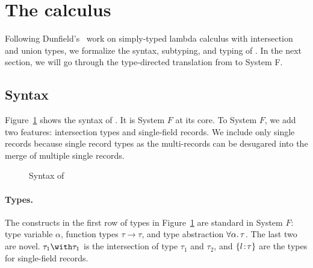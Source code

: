 \section{The \name calculus}



Following Dunfield's~\cite{dunfield2014elaborating} work on simply-typed lambda
calculus with intersection and union types, we formalize the syntax, subtyping,
and typing of \name. In the next section, we will go through the type-directed
translation from \name to System F.



\subsection{Syntax}

Figure~\ref{fig:fi-syntax} shows the syntax of \name. It is System $ F $ at its
core. To System $ F $, we add two features: intersection types and single-field
records.
We include only single records because single record types as the multi-records
can be desugared into the merge of multiple single records.

\begin{figure}
  
  \caption{Syntax of \name}
  \label{fig:fi-syntax}
\end{figure}

\paragraph{Types.} The constructs in the first row of types in
Figure~\ref{fig:fi-syntax} are standard in System $ F $: type variable
$ \alpha $, function types $ \tau \to \tau $, and type abstraction
$ \forall \alpha. \, \tau $. The last two are novel. $ \tau_1 \Intersect \tau_1 $ is
the intersection of type $ \tau_1 $ and $ \tau_2 $, 
and $ \{ l \!:\! \tau \} $ are the types for single-field records.

